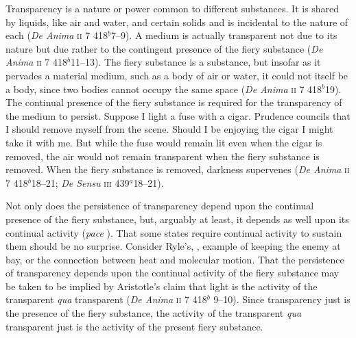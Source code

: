 Transparency is a nature or power common to different substances. It is shared by liquids, like air and water, and certain solids and is incidental to the nature of each (\emph{De Anima} \textsc{ii} 7 418\( ^{b} \)7--9). A medium is actually transparent not due to its nature but due rather to the contingent presence of the fiery substance (\emph{De Anima} \textsc{ii} 7 418\( ^{b} \)11--13). The fiery substance is a substance, but insofar as it pervades a material medium, such as a body of air or water, it could not itself be a body, since two bodies cannot occupy the same space (\emph{De Anima} \textsc{ii} 7 418\( ^{b} \)19). The continual presence of the fiery substance is required for the transparency of the medium to persist. Suppose I light a fuse with a cigar. Prudence councils that I should remove myself from the scene. Should I be enjoying the cigar I might take it with me. But while the fuse would remain lit even when the cigar is removed, the air would not remain transparent when the fiery substance is removed. When the fiery substance is removed, darkness supervenes (\emph{De Anima} \textsc{ii} 7 418\( ^{b} \)18--21; \emph{De Sensu} \textsc{iii} 439\( ^{a} \)18--21). 

Not only does the persistence of transparency depend upon the continual presence of the fiery substance, but, arguably at least, it depends as well upon its continual activity (\emph{pace} \citealt[]{Sambursky:1958aa} \citealt[424]{Burnyeat:1995fk}). That some states require continual activity to sustain them should be no surprise. Consider Ryle's, \citeyearpar[149]{Ryle:1949qr}, example of keeping the enemy at bay, or the connection between heat and molecular motion. That the persistence of transparency depends upon the continual activity of the fiery substance may be taken to be implied by Aristotle's claim that light is the activity of the transparent \emph{qua} transparent (\emph{De Anima} \textsc{ii} 7 418\( ^{b} \) 9--10). Since transparency just is the presence of the fiery substance, the activity of the transparent \emph{qua} transparent just is the activity of the present fiery substance.

